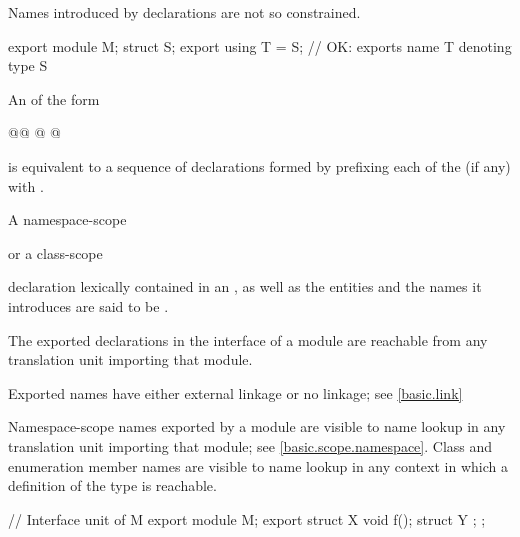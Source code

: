 \begin{std.txt}
  \enternote
  Names introduced by  declarations are not so constrained.
  \begin{example}
    \begin{codeblock}
      export module M;
      struct S;
      export using T = S;   // OK: exports name T denoting type S
    \end{codeblock}
  \end{example}
  \exitnote

  \alinea
  An  of the form
  \begin{grammar}
    @@ @\tcode{\{}  \tcode{\}}@ 
  \end{grammar}
  is equivalent to a sequence of declarations formed by prefixing each
   of the  (if any) with
  .

  \alinea
  A namespace-scope
  \begin{before}\color{addclr}
  or a class-scope
  \end{before}
  declaration lexically
  contained in an , as well as the
  entities and the names it introduces are said to be .
  \begin{before}\color{addclr}
  The exported declarations in the interface of a module are reachable from
  any translation unit importing that module.  
  \end{before}
  \enternote
  Exported names have either external linkage or no linkage; see \ref{basic.link}
  \begin{after}\color{addclr}
  Namespace-scope names exported by a module are visible to name lookup
  in any translation unit importing that module; see \ref{basic.scope.namespace}.
  Class and enumeration member names are visible to name lookup in any
  context in which a definition of the type is reachable.
  \end{after}
  \exitnote
  \begin{example}
    \begin{codeblock}
      // Interface unit of M
      export module M;
      export struct X {
        void f();
        struct Y { };
      };


\end{codeblock}
\end{example}
\end{std.txt}
